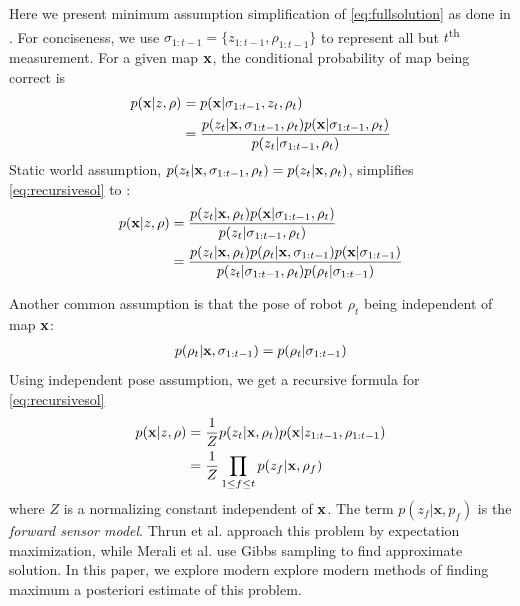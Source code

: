 \documentclass[letterpaper, 10 pt, conference]{ieeeconf} %
\newcommand{\vect}[1]{\mathbf{#1}}
\begin{document}
   Here we present minimum assumption simplification of
   \eqref{eq:fullsolution} as done in \cite{thrun2003learning,
   merali2013icra}. 
   For conciseness, we use 
   $\sigma_{1:t-1} = \{z_{1:t-1}, \rho_{1:t-1}\}$ to represent all but
   $t$\textsuperscript{th} measurement. For a given map $\map$, the conditional
   probability of map being correct is
   \begin{align}
     p(\map | z, \rho) &= p(\map | \sigma_{1:t-1}, z_t, \rho_t)\\
                    &= \frac{p(z_t|\map , \sigma_{1:t-1}, \rho_t)p(\map| \sigma_{1:t-1}, \rho_t)}
                            {p(z_t|\sigma_{1:t-1}, \rho_t)}
     \label{eq:recursivesol}
   \end{align}
   Static world assumption, $p(z_t|\map, \sigma_{1:t-1}, \rho_t) = p(z_t|\map, \rho_t)$, simplifies \eqref{eq:recursivesol} to :
   \begin{align}
     p(\map|z, \rho) &= \frac{p(z_t|\map, \rho_t)p(\map| \sigma_{1:t-1}, \rho_t)}
                          {p(z_t|\sigma_{1:t-1}, \rho_t)}\\
                  &= \frac{p(z_t|\map, \rho_t)p(\rho_t|\map, \sigma_{1:t-1})p(\map| \sigma_{1:t-1})}
                          {p(z_t|\sigma_{1:t-1}, \rho_t)p(\rho_t|\sigma_{1:t-1})}
   \end{align}

   Another common assumption is that the pose of robot $\rho_t$ being independent of map $\map$:
   \begin{align}
     p(\rho_t|\map, \sigma_{1:t-1}) = p(\rho_t|\sigma_{1:t-1})
   \end{align}
   Using independent pose assumption, we get a recursive formula for \eqref{eq:recursivesol}
   \begin{align}
     p(\map | z, \rho) &= \frac{1}{Z} p(z_t|\map , \rho_t)p(\map| z_{1:t-1}, \rho_{1:t-1})\\
                       &= \frac{1}{Z} \prod_{1 \le f \le t} p(z_f|\map, \rho_f)
     \label{eq:map}
   \end{align}
   where $Z$ is a normalizing constant independent of $\map$. The term $p(z_f|\vect{x}, p_f)$ is the \emph{forward sensor model}. Thrun et al. \cite{thrun2003learning} approach this problem by expectation maximization, while Merali et al. \cite{merali2013icra} use Gibbs sampling to find approximate solution. In this paper, we explore modern explore modern methods of finding maximum a posteriori estimate of this problem.
\end{document}
